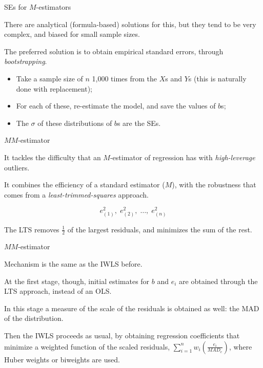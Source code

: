 \documentclass[12pt,english,pdf,xcolor=dvipsnames,aspectratio=169,handout]{beamer}\usepackage[]{graphicx}\usepackage[]{xcolor}
\begin{document}
\begin{frame}{SEs for $M$-estimators}

There are analytical (formula-based) solutions for this, but they tend to be very complex, and biased for small sample sizes.\bigskip

The preferred solution is to obtain empirical standard errors, through \textit{bootstrapping}.\bigskip

\begin{itemize}
\item Take a sample size of $n$ 1,000 times from the $X$s and $Y$s (this is naturally done with replacement);
\item For each of these, re-estimate the model, and save the values of $b$s;
\item The $\sigma$ of these distributions of $b$s are the SEs.
\end{itemize}

\end{frame}



\begin{frame}{$MM$-estimator}

It tackles the difficulty that an $M$-estimator of regression has with \textit{high-leverage} outliers.\bigskip

It combines the efficiency of a standard estimator ($M$), with the robustness that comes from a \textit{least-trimmed-squares} approach.\bigskip

\begin{equation}
e_{(1)}^2,\; e_{(2)}^2,\; \dots,\; e_{(n)}^2
\end{equation}

The LTS removes $\frac{1}{2}$ of the largest residuals, and minimizes the sum of the rest.

\end{frame}



\begin{frame}{$MM$-estimator}

Mechanism is the same as the IWLS before.\bigskip

At the first stage, though, initial estimates for $b$ and $e_i$ are obtained through the LTS approach, instead of an OLS.\bigskip

In this stage a measure of the scale of the residuals is obtained as well: the MAD of the distribution.\bigskip

Then the IWLS proceeds as usual, by obtaining regression coefficients that minimize a weighted function of the scaled residuals, $\sum_{i=1}^nw_i(\frac{e_i}{MAD_e})$, where Huber weights or biweights are used.

\end{frame}
\end{document}
